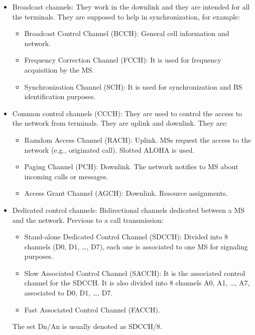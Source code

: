 \documentclass[../main.tex]{subfiles}
\begin{document}
\begin{itemize}
	\item {
		Broadcast channels: They work in the downlink and they are intended for all the terminals. They are supposed to help in synchronization, for example:
		\begin{itemize}
			\item Broadcast Control Channel (BCCH): General cell information and network.
			\item Frequency Correction Channel (FCCH): It is used for frequency acquisition by the MS.
			\item Synchronization Channel (SCH): It is used for synchronization and BS identification purposes.
		\end{itemize}
	}
	\item {
		Common control channels (CCCH): They are used to control the access to the network from terminals. They are uplink and downlink. They are:
		\begin{itemize}
			\item Ramdom Access Channel (RACH): Uplink. MSs request the access to the network (e.g., originated call). Slotted ALOHA is used.
			\item Paging Channel (PCH): Downlink. The network notifies to MS about incoming calls or messages.
			\item Access Grant Channel (AGCH): Downlink. Resource assignments.
		\end{itemize}
	}
	\item {
		Dedicated control channels: Bidirectional channels dedicated between a MS and the network. Previous to a call transmission:
		\begin{itemize}
			\item Stand-alone Dedicated Control Channel (SDCCH): Divided into 8 channels (D0, D1, \ldots, D7), each one is associated to one MS for signaling purposes.
			\item Slow Associated Control Channel (SACCH): It is the associated control channel for the SDCCH. It is also divided into 8 channels A0, A1, \ldots, A7, associated to D0, D1, \ldots, D7.
			\item Fast Associated Control Channel (FACCH).
		\end{itemize}
		The set Dn/An is usually denoted as SDCCH/8.
	}
\end{itemize}
\end{document}
